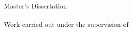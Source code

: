 \begin{titlepage}
\color{PANTONECoolGray7C}
\thelogo
\leading{20.4pt}
{\Large
\theauthor
\\
%
\\
\textbf{\thetitleA}
\\
\textbf{\thetitleB}
\\
\textbf{\thetitleC}
}

\vspace*{\fill}
{\footnotesize \myear}
\end{titlepage}

\null
\thispagestyle{empty}
\pagecolor{PANTONECoolGray7C}
\afterpage{\nopagecolor}
\newpage

\begin{titlepage}
\color{PANTONECoolGray7C}
\thelogoB
\leading{20.4pt}
{\Large
\theauthor
\\
%
\\
\textbf{\thetitleA}
\\
\textbf{\thetitleB}
\\
\textbf{\thetitleC}
}

\vspace{55.2mm}
\leading{16.8pt}
{\large
Master’s Dissertation
\\
\themasters
\\
\thearea
Work carried out under the supervision of
\\
\textbf{\thesupervisor}
\\
\thecosupervisor}

\vspace*{\fill}
{\footnotesize \myear}
\end{titlepage}


